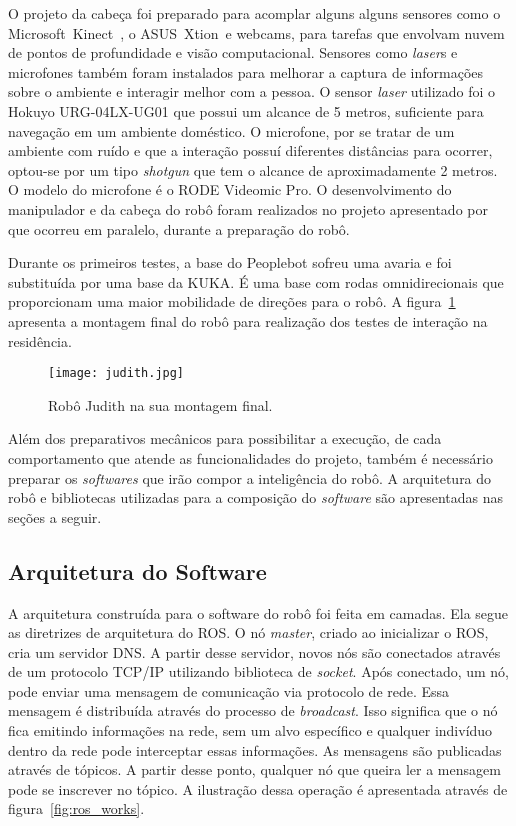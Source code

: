 O projeto da cabeça foi preparado para acomplar alguns alguns sensores como o Microsoft\textregistered\ Kinect\textregistered\ , o ASUS\textregistered\ Xtion\textregistered\ e webcams, para tarefas que envolvam nuvem de pontos de profundidade e visão computacional. Sensores como \emph{laser}s e microfones também foram instalados para melhorar a captura de informações sobre o ambiente e interagir melhor com a pessoa. O sensor \emph{laser} utilizado foi o Hokuyo URG-04LX-UG01 que possui um alcance de 5 metros, suficiente para navegação em um ambiente doméstico. O microfone, por se tratar de um ambiente com ruído e que a interação possuí diferentes distâncias para ocorrer, optou-se por um tipo \emph{shotgun} que tem o alcance de aproximadamente 2 metros. O modelo do microfone é o RODE Videomic Pro. O desenvolvimento do manipulador e da cabeça do robô foram realizados no projeto apresentado por \textcite{gonbata:2016} que ocorreu em paralelo, durante a preparação do robô.

Durante os primeiros testes, a base do Peoplebot sofreu uma avaria e foi substituída por uma base da KUKA. É uma base com rodas omnidirecionais que proporcionam uma maior mobilidade de direções para o robô. A figura~\ref{fig:newjudith} apresenta a montagem final do robô para realização dos testes de interação na residência.

\begin{figure}[ht!]
	\centering
	\begin{minipage}{0.4\textwidth}
		\caption{Robô Judith na sua montagem final.}
		\texttt{[image: judith.jpg]}
		\label{fig:newjudith}
	\end{minipage}
\end{figure}

Além dos preparativos mecânicos para possibilitar a execução, de cada comportamento que atende as funcionalidades do projeto, também é necessário preparar os \emph{softwares} que irão compor a inteligência do robô. A arquitetura do robô e bibliotecas utilizadas para a composição do \emph{software} são apresentadas nas seções a seguir.

\subsection{Arquitetura do Software} %
\label{sec:arquitetura}
A arquitetura construída para o software do robô foi feita em camadas. Ela segue as diretrizes de arquitetura do ROS. O nó \textit{master}, criado ao inicializar o ROS, cria um servidor DNS. A partir desse servidor, novos nós são conectados através de um protocolo TCP/IP utilizando biblioteca de \textit{socket}. Após conectado, um nó, pode enviar uma mensagem de comunicação via protocolo de rede. Essa mensagem é distribuída através do processo de \textit{broadcast}. Isso significa que o nó fica emitindo informações na rede, sem um alvo específico e qualquer indivíduo dentro da rede pode interceptar essas informações. As mensagens são publicadas através de tópicos. A partir desse ponto, qualquer nó que queira ler a mensagem pode se inscrever no tópico. A ilustração dessa operação é apresentada através de figura~\ref{fig:ros_works}.

